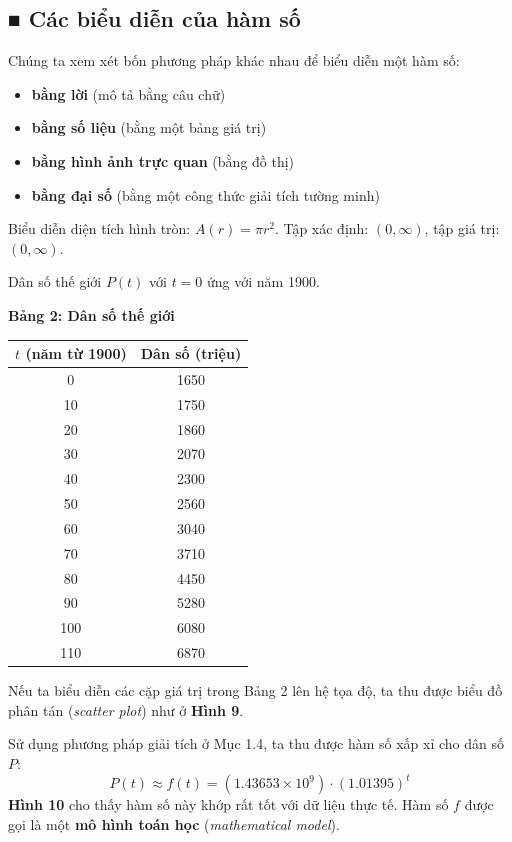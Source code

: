 \documentclass[10pt,a4paper]{article}
\begin{document}
\subsection*{\color{stewartblue}■ Các biểu diễn của hàm số}

Chúng ta xem xét bốn phương pháp khác nhau để biểu diễn một hàm số:
\begin{itemize}[itemsep=0.1cm]
    \item \textbf{bằng lời} (mô tả bằng câu chữ)
    \item \textbf{bằng số liệu} (bằng một bảng giá trị)
    \item \textbf{bằng hình ảnh trực quan} (bằng đồ thị)
    \item \textbf{bằng đại số} (bằng một công thức giải tích tường minh)
\end{itemize}

\begin{description}[leftmargin=1.8em, itemsep=0.3cm]
    \item[\textbf{A.}] Biểu diễn diện tích hình tròn: $A(r) = \pi r^2$. Tập xác định: $(0, \infty)$, tập giá trị: $(0, \infty)$.
    \item[\textbf{B.}] Dân số thế giới $P(t)$ với $t = 0$ ứng với năm 1900.
\end{description}

\vspace{0.2cm}
\noindent
\begin{minipage}[t]{0.35\textwidth}
    \centering
    \textbf{\textsf{Bảng 2: Dân số thế giới}}\\[0.15cm]
    \small
    \begin{tabular}{cc}
        \toprule
        \textbf{$t$ (năm từ 1900)} & \textbf{Dân số (triệu)} \\
        \midrule
        0 & 1650 \\
        10 & 1750 \\
        20 & 1860 \\
        30 & 2070 \\
        40 & 2300 \\
        50 & 2560 \\
        60 & 3040 \\
        70 & 3710 \\
        80 & 4450 \\
        90 & 5280 \\
        100 & 6080 \\
        110 & 6870 \\
        \bottomrule
    \end{tabular}
\end{minipage}
\hfill
\begin{minipage}[t]{0.62\textwidth}
    Nếu ta biểu diễn các cặp giá trị trong Bảng 2 lên hệ tọa độ, ta thu được biểu đồ phân tán (\textit{scatter plot}) như ở \textbf{Hình 9}.
    
    Sử dụng phương pháp giải tích ở Mục 1.4, ta thu được hàm số xấp xỉ cho dân số $P$:
    \[
    P(t) \approx f(t) = (1.43653 \times 10^9) \cdot (1.01395)^t
    \]
    \textbf{Hình 10} cho thấy hàm số này khớp rất tốt với dữ liệu thực tế. Hàm số $f$ được gọi là một \textbf{mô hình toán học} (\textit{mathematical model}).
\end{minipage}
\end{document}
